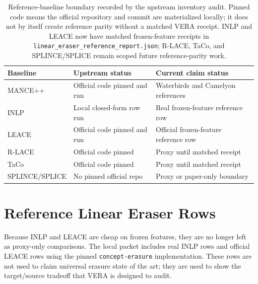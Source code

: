 \documentclass[10pt]{article}
\begin{document}
\begin{table}[t]
\centering
\small
\begin{tabular}{@{}lll@{}}
\toprule
Baseline & Upstream status & Current claim status \\
\midrule
MANCE++ & Official code pinned and run & Waterbirds and Camelyon references \\
INLP & Local closed-form row run & Real frozen-feature reference row \\
LEACE & Official code pinned and run & Official frozen-feature reference row \\
R-LACE & Official code pinned & Proxy until matched receipt \\
TaCo & Official code pinned & Proxy until matched receipt \\
SPLINCE/SPLICE & No pinned official repo & Proxy or paper-only boundary \\
\bottomrule
\end{tabular}
\caption{Reference-baseline boundary recorded by the upstream inventory audit.
Pinned code means the official repository and commit are materialized locally;
it does not by itself create reference parity without a matched VERA receipt.
INLP and LEACE now have matched frozen-feature receipts in
\texttt{linear\_eraser\_reference\_report.json}; R-LACE, TaCo, and
SPLINCE/SPLICE remain scoped future reference-parity work.}
\label{tab:reference-boundary}
\end{table}

\section{Reference Linear Eraser Rows}

Because INLP and LEACE are cheap on frozen features, they are no longer left as
proxy-only comparisons. The local packet includes real INLP rows and official
LEACE rows using the pinned \texttt{concept-erasure} implementation. These rows
are not used to claim universal erasure state of the art; they are used to show
the target/source tradeoff that VERA is designed to audit.
\end{document}

